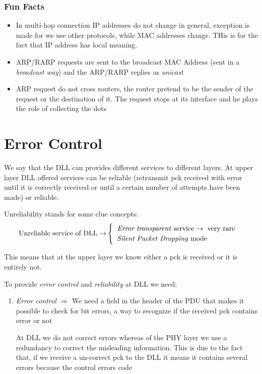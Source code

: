 \subsection{Fun Facts}
\begin{itemize}
\item In multi-hop connection IP addresses do not change in general, exception is made for we use other protocols, while MAC addresses change. THis is for the fact that IP address has local meaning.
\item ARP/RARP requests are sent to the broadcast MAC Address (sent in a \textit{broadcast way}) and the ARP/RARP replies as \emph{unicast}
\item ARP request do not cross routers, the router pretend to be the sender of the request or the destination of it. The request stops at its interface and he plays the role of collecting the dots
\end{itemize}

\chapter{Error Control}
We say that the DLL can provides different services to different layers.
At upper layer DLL offered services can be reliable (retransmit pck received with error until it is correctly received or until a certain number of attempts have been made) or reliable. 

Unreliability stands for some clue concepts:
\begin{equation}{\text{Unreliable service of DLL}\rightarrow}
\begin{cases}
\text{\textit{ Error transparent} service} \rightarrow \text{ very rare}\\
\text{ \textit{Silent Packet Dropping} mode} 
\end{cases}
\end{equation}

This means that at the upper layer we know either a pck is received or it is entirely not. 

To provide \textit{error control} and \textit{reliability} at DLL we need: 
\begin{enumerate}
\item \textit{Error control} $\Rightarrow$ We need a field in the header of the PDU that makes it possible to check for bit errors, a way to recognize if the received pck contains error or not

At DLL we do not correct errors whereas of the PHY layer we use a redundancy to correct the misleading information. This is due to the fact that, if we receive a un-correct pck to the DLL it means it contains several errors because the control errors code 
\end{enumerate}

